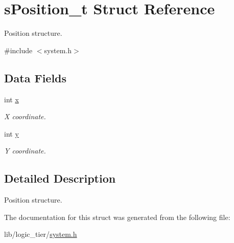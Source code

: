 \hypertarget{structs_position__t}{}\section{s\+Position\+\_\+t Struct Reference}
\label{structs_position__t}


Position structure.  




{\ttfamily \#include $<$system.\+h$>$}

\subsection*{Data Fields}
\begin{DoxyCompactItemize}
\item 
int \hyperlink{structs_position__t_a6150e0515f7202e2fb518f7206ed97dc}{x}\hypertarget{structs_position__t_a6150e0515f7202e2fb518f7206ed97dc}{}\label{structs_position__t_a6150e0515f7202e2fb518f7206ed97dc}

\begin{DoxyCompactList}\small\item\em X coordinate. \end{DoxyCompactList}\item 
int \hyperlink{structs_position__t_a0a2f84ed7838f07779ae24c5a9086d33}{y}\hypertarget{structs_position__t_a0a2f84ed7838f07779ae24c5a9086d33}{}\label{structs_position__t_a0a2f84ed7838f07779ae24c5a9086d33}

\begin{DoxyCompactList}\small\item\em Y coordinate. \end{DoxyCompactList}\end{DoxyCompactItemize}


\subsection{Detailed Description}
Position structure. 

The documentation for this struct was generated from the following file\+:\begin{DoxyCompactItemize}
\item 
lib/logic\+\_\+tier/\hyperlink{system_8h}{system.\+h}\end{DoxyCompactItemize}
